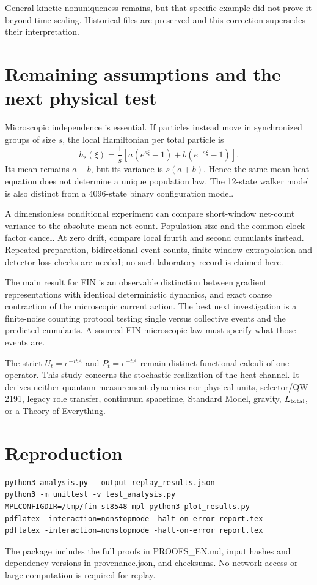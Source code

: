 \documentclass[11pt,a4paper]{article}
\begin{document}
General kinetic nonuniqueness remains, but that specific example did not
prove it beyond time scaling. Historical files are preserved and this
correction supersedes their interpretation.

\section{Remaining assumptions and the next physical test}

Microscopic independence is essential. If particles instead move in
synchronized groups of size \(s\), the local Hamiltonian per total particle is
\[
h_s(\xi)=\frac1s\left[a(e^{s\xi}-1)+b(e^{-s\xi}-1)\right].
\]
Its mean remains \(a-b\), but its variance is \(s(a+b)\). Hence the same
mean heat equation does not determine a unique population law. The
12-state walker model is also distinct from a 4096-state binary
configuration model.

A dimensionless conditional experiment can compare short-window net-count
variance to the absolute mean net count. Population size and the common clock
factor cancel. At zero drift, compare local fourth and second cumulants
instead. Repeated preparation, bidirectional event counts, finite-window
extrapolation and detector-loss checks are needed; no such laboratory record
is claimed here.

The main result for FIN is an observable distinction between gradient
representations with identical deterministic dynamics, and exact coarse
contraction of the microscopic current action. The best next investigation
is a finite-noise counting protocol testing single versus collective events
and the predicted cumulants. A sourced FIN microscopic law must specify what
those events are.

The strict \(U_t=e^{-itA}\) and \(P_t=e^{-tA}\) remain distinct functional
calculi of one operator. This study concerns the stochastic realization of
the heat channel. It derives neither quantum measurement dynamics nor
physical units, selector/QW-2191, legacy role transfer, continuum spacetime,
Standard Model, gravity, \(L_{\rm total}\), or a Theory of Everything.

\appendix
\section{Reproduction}
\begin{verbatim}
python3 analysis.py --output replay_results.json
python3 -m unittest -v test_analysis.py
MPLCONFIGDIR=/tmp/fin-st8548-mpl python3 plot_results.py
pdflatex -interaction=nonstopmode -halt-on-error report.tex
pdflatex -interaction=nonstopmode -halt-on-error report.tex
\end{verbatim}
The package includes the full proofs in PROOFS\_EN.md, input hashes and
dependency versions in provenance.json, and checksums. No network access or
large computation is required for replay.
\end{document}
